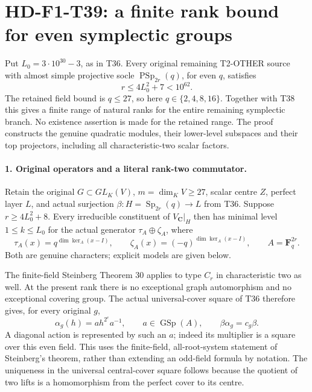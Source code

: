 \section[HD-F1-T39: an effective even symplectic rank cutoff]{HD-F1-T39: a finite rank bound for even symplectic groups}
\label{sec:f1-symplectic-even-quadratic-rank-cutoff}

Put \(L_0=3\cdot10^{30}-3\), as in T36. Every original
remaining T2-OTHER source with almost simple projective
socle \(\operatorname{PSp}_{2r}(q)\), for even \(q\), satisfies
\[
 \boxed{\qquad r\le 4L_0^2+7<10^{62}.\qquad}
 \tag{F1T39.1}
\]
The retained field bound is \(q\le27\), so here
\(q\in\{2,4,8,16\}\). Together with T38 this gives a
finite range of natural ranks for the entire remaining
symplectic branch. No existence assertion is made for the
retained range. The proof constructs the genuine quadratic
modules, their lower-level subspaces and their top
projectors, including all characteristic-two scalar factors.

\paragraph{1. Original operators and a literal rank-two commutator.}
Retain the original \(G\subset GL_K(V)\),
\(m=\dim_KV\ge27\), scalar centre \(Z\), perfect layer
\(L\), and actual surjection
\(\beta:H=\operatorname{Sp}_{2r}(q)\longrightarrow L\)
from T36. Suppose \(r\ge4L_0^2+8\). Every irreducible
constituent of \(V_{\mathbf C}|_H\) then has minimal
level \(1\le k\le L_0\) for the actual generator
\(\tau_A\oplus\zeta_A\), where
\[
 \tau_A(x)=q^{\dim\ker_A(x-I)},\qquad
 \zeta_A(x)=(-q)^{\dim\ker_A(x-I)},\qquad
 A=\mathbf F_q^{2r}.
 \tag{F1T39.2}
\]
Both are genuine characters; explicit models are given below.

The finite-field Steinberg Theorem 30 applies to type
\(C_r\) in characteristic two as well. At the present
rank there is no exceptional graph automorphism and no
exceptional covering group. The actual universal-cover
square of T36 therefore gives, for every original \(g\),
\[
 \alpha_g(h)=a h^{2^e}a^{-1},\qquad
 a\in\operatorname{GSp}(A),\qquad
 \beta\alpha_g=c_g\beta.
 \tag{F1T39.3}
\]
A diagonal action is represented by such an \(a\);
indeed its multiplier is a square over this even field.
This uses the finite-field, all-root-system statement of
Steinberg's theorem, rather than extending an odd-field
formula by notation. The uniqueness in the universal
central-cover square follows because the quotient of two
lifts is a homomorphism from the perfect cover to its centre.

